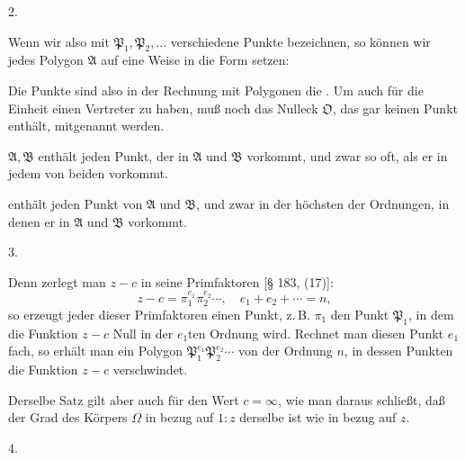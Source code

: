 2. 

Wenn wir also mit $\mathfrak{P}_1, \mathfrak{P}_2, \ldots$ verschiedene Punkte bezeichnen, so können wir jedes Polygon $\mathfrak{A}$ auf eine Weise in die Form setzen:


Die Punkte sind also in der Rechnung mit Polygonen die . Um auch für die Einheit einen Vertreter zu haben, muß noch das \glqq Nulleck\grqq{} $\mathfrak{O}$, das gar keinen Punkt enthält, mitgenannt werden.

 $\mathfrak{A}, \mathfrak{B}$ enthält jeden Punkt, der in $\mathfrak{A}$ und $\mathfrak{B}$ vorkommt, und zwar so oft, als er in jedem von beiden vorkommt.

 enthält jeden Punkt von $\mathfrak{A}$ und $\mathfrak{B}$, und zwar in der höchsten der Ordnungen, in denen er in $\mathfrak{A}$ und $\mathfrak{B}$ vorkommt.

3. 

Denn zerlegt man $z - c$ in seine Primfaktoren [§ 183, (17)]:
\[
z - c = \pi_1^{e_1}\pi_2^{e_2}\cdots, \quad e_1 + e_2 + \cdots = n,
\]
so erzeugt jeder dieser Primfaktoren einen Punkt, z.\,B. $\pi_1$ den Punkt $\mathfrak{P}_1$, in dem die Funktion $z - c$ Null in der $e_1$ten Ordnung wird. Rechnet man diesen Punkt $e_1$fach, so erhält man ein Polygon $\mathfrak{P}_1^{e_1}\mathfrak{P}_2^{e_2}\cdots$ von der Ordnung $n$, in dessen Punkten die Funktion $z - c$ verschwindet.

Derselbe Satz gilt aber auch für den Wert $c = \infty$, wie man daraus schließt, daß der Grad des Körpers $\Omega$ in bezug auf $1 : z$ derselbe ist wie in bezug auf $z$.

4. 
